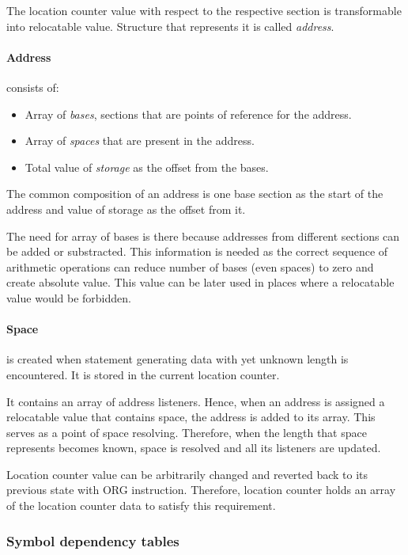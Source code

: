 The location counter value with respect to the respective section is transformable into relocatable value. Structure that represents it is called \emph{address}.

\paragraph*{Address} consists of:
\begin{itemize}
	\item Array of \emph{bases}, sections that are points of reference for the address.
	\item Array of \emph{spaces} that are present in the address. 
	\item Total value of \emph{storage} as the offset from the bases.
\end{itemize}

The common composition of an address is one base section as the start of the address and value of storage as the offset from it.

The need for array of bases is there because addresses from different sections can be added or substracted. This information is needed as the correct sequence of arithmetic operations can reduce number of bases (even spaces) to zero and create absolute value. This value can be later used in places where a relocatable value would be forbidden.

\paragraph*{Space} is created when statement generating data with yet unknown length is encountered. It is stored in the current location counter. 

It contains an array of address listeners. Hence, when an address is assigned a relocatable value that contains space, the address is added to its array. This serves as a point of space resolving. Therefore, when the length that space represents becomes known, space is resolved and all its listeners are updated.

\vspace{0.5cm}

Location counter value can be arbitrarily changed and reverted back to its previous state with ORG instruction. Therefore, location counter holds an array of the location counter data to satisfy this requirement.

\subsubsection{Symbol dependency tables}

